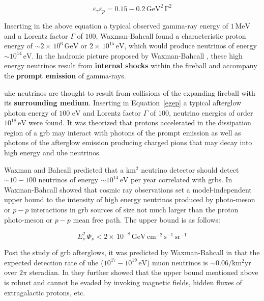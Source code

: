 \begin{equation*}
\varepsilon_\gamma \varepsilon_p = 0.15 - 0.2 \, \mathrm{GeV^2 \, \Gamma^2}
\label{egep}
\end{equation*}

Inserting in the above equation a typical observed gamma-ray energy of $1 \, \mathrm{MeV}$ and a Lorentz factor $\Gamma$ of $100$, Waxman-Bahcall found a characteristic proton energy of $\sim 2 \times \, 10^{6} \, \mathrm{GeV}$ or $2 \times \, 10^{15} \, \mathrm{eV}$, which would produce neutrinos of energy $\sim 10^{14} \, \mathrm{eV}$. In the hadronic picture proposed by Waxman-Bahcall \cite{firstcalc,WBub,afterglows,ubrobust}, these high energy neutrinos result from {\bf internal shocks} within the fireball and accompany the {\bf prompt emission} of gamma-rays. 

\gls{uhe} neutrinos are thought to result from collisions of the expanding fireball with its {\bf surrounding medium}.
Inserting in Equation~\ref{egep} a typical afterglow photon energy of $100 \,\, \mathrm{eV}$ and Lorentz factor $\Gamma$ of $100$, neutrino energies of order $10^{18} \, \mathrm{eV}$ were found. It was theorized that protons accelerated in the dissipation region of a \gls{grb} may interact with photons of the prompt emission as well as photons of the afterglow emission producing charged pions that may decay into high energy and \gls{uhe} neutrinos. 

Waxman and Bahcall \cite{firstcalc} predicted that a $\mathrm{km^2}$ neutrino detector should detect $\sim 10 - 100$ neutrinos of energy $\sim 10^{14} \, \mathrm{eV}$ per year correlated with \gls{grbs}. In \cite{WBub} Waxman-Bahcall showed that cosmic ray observations set a model-independent upper bound to the intensity of high energy neutrinos produced by photo-meson or $p-p$ interactions in \gls{grb} sources of size not much larger than the proton photo-meson or $p-p$ mean free path. The upper bound is as follows: 

\begin{equation*}
E_{\nu}^2 \, \Phi_{\nu}<2 \times \, 10^{-8}\, \mathrm{GeV \, cm^{-2} \, s^{-1} \, sr^{-1}}
\end{equation*}

Post the study of \gls{grb} afterglows, it was predicted by Waxman-Bahcall in \cite{afterglows} that the expected detection rate of \gls{uhe} ($10^{17} - 10^{19} \, \mathrm{eV}$) muon neutrinos is $\sim 0.06/\mathrm{ km^2 yr}$ over $2 \pi$ steradian. In \cite{ubrobust} they further showed that the upper bound mentioned above is robust and cannot be evaded by invoking magnetic fields, hidden fluxes of extragalactic protons, etc.

